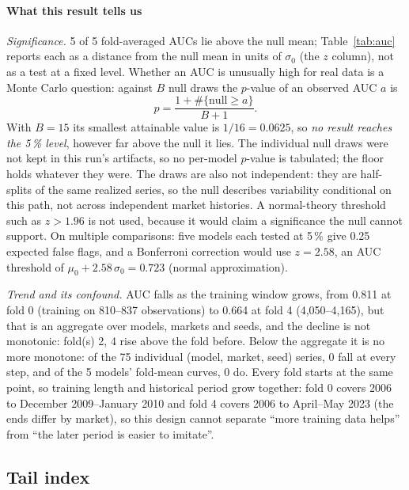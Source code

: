 \documentclass[11pt,a4paper]{article}
\makeatletter
\DeclareRobustCommand{\_}{\ifmmode\nfss@text{\textunderscore}\else\textunderscore\allowbreak\fi}
\makeatother
\begin{document}
\paragraph{What this result tells us} \emph{Significance.} 5 of 5 fold-averaged AUCs lie above the null mean; Table~\ref{tab:auc} reports each as a distance from the null mean in units of $\sigma_0$ (the $z$ column), not as a test at a fixed level. Whether an AUC is unusually high for real data is a Monte Carlo question: against $B$ null draws the $p$-value of an observed AUC $a$ is
\[ p=\frac{1+\#\{\text{null}\ge a\}}{B+1}. \]
With $B=15$ its smallest attainable value is $1/16=0.0625$, so \emph{no result reaches the 5\,\% level}, however far above the null it lies. The individual null draws were not kept in this run's artifacts, so no per-model $p$-value is tabulated; the floor holds whatever they were. The draws are also not independent: they are half-splits of the same realized series, so the null describes variability conditional on this path, not across independent market histories. A normal-theory threshold such as $z>1.96$ is not used, because it would claim a significance the null cannot support. On multiple comparisons: five models each tested at 5\,\% give 0.25 expected false flags, and a Bonferroni correction would use $z=2.58$, an AUC threshold of $\mu_0+2.58\,\sigma_0=0.723$ (normal approximation).

\emph{Trend and its confound.} AUC falls as the training window grows, from 0.811 at fold 0 (training on 810--837 observations) to 0.664 at fold 4 (4,050--4,165), but that is an aggregate over models, markets and seeds, and the decline is not monotonic: fold(s) 2, 4 rise above the fold before. Below the aggregate it is no more monotone: of the 75 individual (model, market, seed) series, 0 fall at every step, and of the 5 models' fold-mean curves, 0 do. Every fold starts at the same point, so training length and historical period grow together: fold 0 covers 2006 to December 2009--January 2010 and fold 4 covers 2006 to April--May 2023 (the ends differ by market), so this design cannot separate ``more training data helps'' from ``the later period is easier to imitate''.

\subsection{Tail index}
\label{sec:tail}
\end{document}
